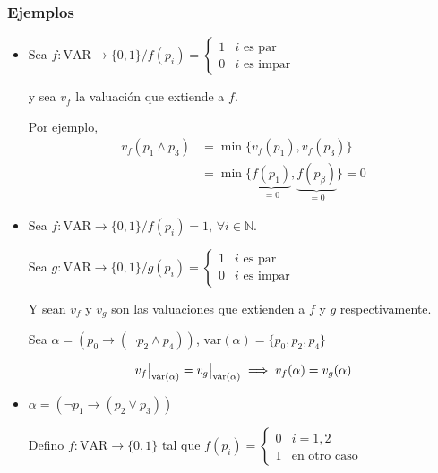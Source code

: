 \subsubsection{Ejemplos}

\begin{itemize}
    \item Sea $f: \mathrm{VAR} \to \{ 0,1 \} / f(p_i) =
        \begin{cases}
            1 & i \text{ es par} \\
            0 & i \text{ es impar}
        \end{cases}$

    y sea $v_f$ la valuación que extiende a $f$.


    Por ejemplo,
    \begin{align*}
        v_f(p_1 \wedge p_3) &= \min{\{ v_f(p_1), v_f(p_3)\}} \\
                            &= \min{\{ \underbrace{f(p_1)}_{=0},
                            \underbrace{f(p_\beta)}_{=0} \}} = 0
    \end{align*}


    \item Sea $f:\mathrm{VAR} \to \{ 0,1 \} / f(p_i) = 1$, $\forall i \in \mathbb{N}$. 
 
    Sea $g: \mathrm{VAR} \to \{ 0,1 \} / g(p_i) =
        \begin{cases}
            1 & i \text{ es par} \\
            0 & i \text{ es impar}
        \end{cases}$
 
    Y sean $v_f$ y $v_g$ son las valuaciones que extienden a $f$ 
    y $g$ respectivamente.
 
    Sea $\alpha = (p_0 \to (\neg p_2 \wedge p_4))$, 
    $\mathrm{var}(\alpha) = \{ p_0,p_2,p_4 \}$

    \begin{gather*}
        \frest{v_f}{\mathrm{var}(\alpha)} = \frest{v_g}{\mathrm{var}(\alpha)} 
        \implies v_f(\alpha) = v_g(\alpha)
    \end{gather*}

     \item $\alpha = (\neg p_1 \to (p_2 \vee p_3))$

         Defino $f: \mathrm{VAR} \to \{ 0, 1 \}$ tal que
         $f(p_i) = \begin{cases}
             0 & i = 1, 2 \\
             1 & \text{en otro caso}
         \end{cases}$


\end{itemize}
